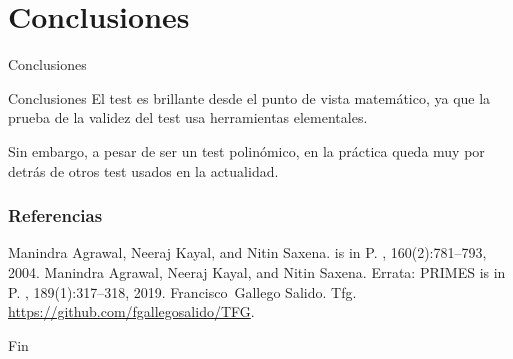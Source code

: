 \documentclass{beamer}
\begin{document}
\section{Conclusiones}

\begin{frame}
	\centering
	\begin{Huge}
		Conclusiones
	\end{Huge}
\end{frame}

\begin{frame}{Conclusiones}
	\onslide<1->El test es brillante desde el punto de vista matemático, ya que la prueba de la validez del test usa herramientas elementales.\break
	
	Sin embargo, a pesar de ser un test polinómico, en la práctica queda muy por detrás de otros test usados en la actualidad.
\end{frame}


\begin{frame}
\frametitle{Referencias}
\footnotesize{
	\begin{thebibliography}{99} %
		Manindra Agrawal, Neeraj Kayal, and Nitin Saxena.
			 is in {P}.
			, 160(2):781--793, 2004.
		Manindra Agrawal, Neeraj Kayal, and Nitin Saxena.
			\newblock Errata: {PRIMES} is in {P}.
			, 189(1):317--318, 2019.
		Francisco~Gallego Salido.
			\newblock Tfg.
			\newblock \url{https://github.com/fgallegosalido/TFG}.
	\end{thebibliography}
}
\end{frame}


\begin{frame}
\Huge{\centerline{Fin}}
\end{frame}

\end{document}
